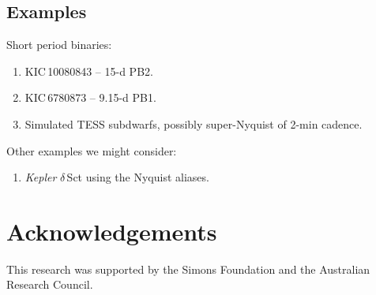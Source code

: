 \documentclass[a4paper,fleqn,usenatbib]{mnras}
\begin{document}
\subsection{Examples}

Short period binaries:
\begin{enumerate}
\item KIC\,10080843 -- 15-d PB2.
\item KIC\,6780873 -- 9.15-d PB1.
\item Simulated TESS subdwarfs, possibly super-Nyquist of 2-min cadence.
\end{enumerate}
Other examples we might consider:
\begin{enumerate}
\item \textit{Kepler} $\delta$\,Sct using the Nyquist aliases.
\end{enumerate}

%

\section*{Acknowledgements}

This research was supported by the Simons Foundation and the Australian Research Council.







\bsp	%
\label{lastpage}
\end{document}
